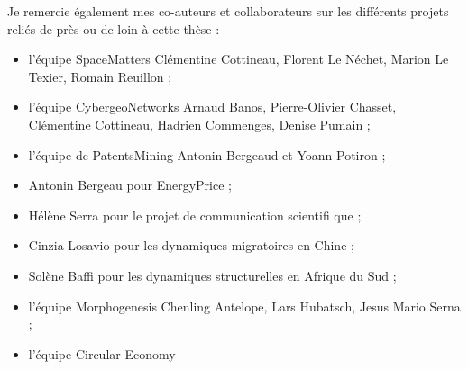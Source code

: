 Je remercie également mes co-auteurs et collaborateurs sur les différents projets reliés de près ou de loin à cette thèse :
\begin{itemize}
	\item l'équipe SpaceMatters Clémentine Cottineau, Florent Le Néchet, Marion Le Texier, Romain Reuillon ;
	\item l'équipe CybergeoNetworks Arnaud Banos, Pierre-Olivier Chasset, Clémentine Cottineau, Hadrien Commenges, Denise Pumain ;
	\item l'équipe de PatentsMining Antonin Bergeaud et Yoann Potiron ;
	\item Antonin Bergeau pour EnergyPrice ;
	\item Hélène Serra pour le projet de communication scientifi	que ;
	\item Cinzia Losavio pour les dynamiques migratoires en Chine ;
	\item Solène Baffi pour les dynamiques structurelles en Afrique du Sud ;
	\item l'équipe Morphogenesis Chenling Antelope, Lars Hubatsch, Jesus Mario Serna ;
	\item l'équipe Circular Economy  
\end{itemize}







































\endgroup